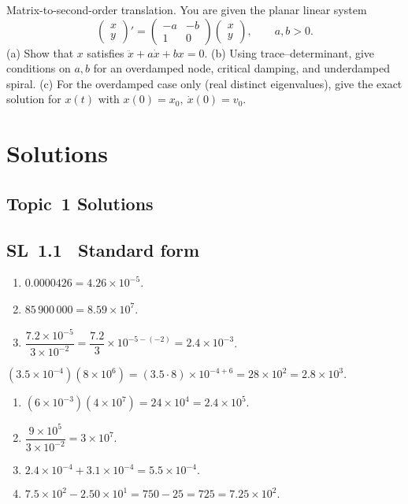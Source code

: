 \documentclass[11pt]{article}
\def\textbf#1{#1}%
\newcommand{\tocsection}[1]{\section{#1}}
\newcommand{\tocsubsection}[1]{\subsection{#1}}
\newcounter{question}
\newcommand{\DisableQuestionHeader}{%
  \fancyhead{}%
}
\begin{document}
\begin{question}
\textbf{Matrix-to-second-order translation.}
You are given the planar linear system
\[
\begin{pmatrix}x\\y\end{pmatrix}'=
\begin{pmatrix}-a&-b\\1&0\end{pmatrix}
\begin{pmatrix}x\\y\end{pmatrix},\qquad a,b>0.
\]
(a) Show that \(x\) satisfies \(\ddot x + a\dot x + b x=0\).  
(b) Using trace–determinant, give conditions on \(a,b\) for an overdamped node, critical damping, and underdamped spiral.  
(c) For the overdamped case only (real distinct eigenvalues), give the exact solution for \(x(t)\) with \(x(0)=x_0,\ \dot x(0)=v_0\).
\end{question}







\DisableQuestionHeader  %
\tocsection{Solutions}


\tocsubsection{Topic 1 Solutions}
\tocsubsection{SL 1.1 \; Standard form}
\begin{solution}
\begin{enumerate}[label=(\alph*)]
\item \(0.0000426 = 4.26\times 10^{-5}\).
\item \(85\,900\,000 = 8.59\times 10^{7}\).
\item \(\dfrac{7.2\times10^{-5}}{3\times10^{-2}} = \dfrac{7.2}{3}\times 10^{-5-(-2)} = 2.4\times 10^{-3}\).
\end{enumerate}
\end{solution}


\begin{solution}
\((3.5\times10^{-4})(8\times10^{6}) = (3.5\cdot 8)\times 10^{-4+6} = 28\times 10^{2} = 2.8\times 10^{3}.\)
\end{solution}


\begin{solution}
\begin{enumerate}[label=(\alph*)]
\item \((6\times10^{-3})(4\times10^{7}) = 24\times 10^{4} = 2.4\times 10^{5}.\)
\item \(\dfrac{9\times10^{5}}{3\times10^{-2}} = 3\times 10^{7}.\)
\item \(2.4\times10^{-4} + 3.1\times10^{-4} = 5.5\times10^{-4}.\)
\item \(7.5\times10^{2} - 2.50\times10^{1} = 750 - 25 = 725 = 7.25\times10^{2}.\)
\end{enumerate}
\end{solution}
\end{document}

